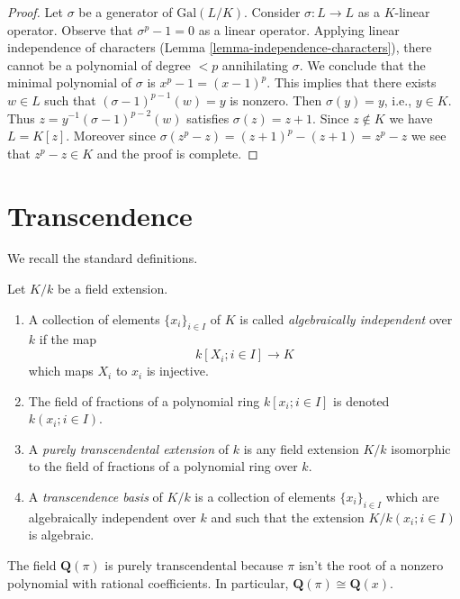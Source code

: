 \begin{proof}
Let $\sigma$ be a generator of $\text{Gal}(L/K)$.
Consider $\sigma : L \to L$ as a $K$-linear operator.
Observe that $\sigma^p - 1 = 0$ as a linear operator.
Applying linear independence of characters
(Lemma \ref{lemma-independence-characters}),
there cannot be a polynomial of degree $< p$
annihilating $\sigma$. We conclude that the minimal
polynomial of $\sigma$ is $x^p - 1 = (x - 1)^p$.
This implies that there exists $w \in L$ such that
$(\sigma - 1)^{p - 1}(w) = y$ is nonzero. Then
$\sigma(y) = y$, i.e., $y \in K$. Thus
$z = y^{-1}(\sigma - 1)^{p - 2}(w)$ satisfies
$\sigma(z) = z + 1$. Since $z \not \in K$ we have $L = K[z]$.
Moreover since $\sigma(z^p - z) = (z + 1)^p - (z + 1) = z^p - z$
we see that $z^p - z \in K$ and the proof is complete.
\end{proof}







\section{Transcendence}
\label{section-transcendence}

\noindent
We recall the standard definitions.

\begin{definition}
\label{definition-transcendence}
Let $K/k$ be a field extension.
\begin{enumerate}
\item A collection of elements $\{x_i\}_{i \in I}$ of $K$ is called
{\it algebraically independent} over $k$ if the map
$$
k[X_i; i\in I] \longrightarrow K
$$
which maps $X_i$ to $x_i$ is injective.
\item The field of fractions of a polynomial ring
$k[x_i; i \in I]$ is denoted $k(x_i; i\in I)$.
\item A {\it purely transcendental extension} of $k$ is any
field extension $K/k$ isomorphic to the field of
fractions of a polynomial ring over $k$.
\item A {\it transcendence basis} of $K/k$ is a
collection of elements $\{x_i\}_{i \in I}$ which are
algebraically independent over $k$ and such that
the extension $K/k(x_i; i\in I)$ is algebraic.
\end{enumerate}
\end{definition}

\begin{example}
\label{example-pi-transcendental}
The field $\mathbf{Q}(\pi)$ is purely transcendental because
$\pi$ isn't the root of a nonzero polynomial with rational coefficients.
In particular, $\mathbf{Q}(\pi) \cong \mathbf{Q}(x)$.
\end{example}

